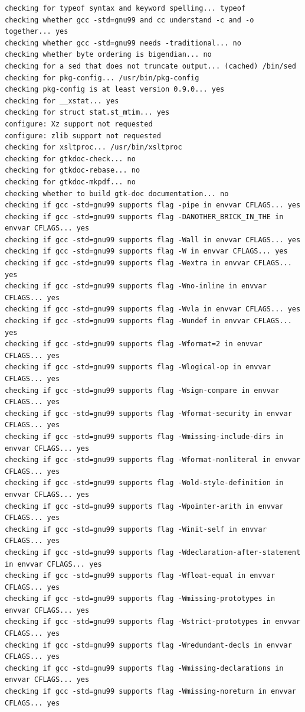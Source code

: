 {\begin{shaded}
\begin{verbatim}
checking for typeof syntax and keyword spelling... typeof
checking whether gcc -std=gnu99 and cc understand -c and -o together... yes
checking whether gcc -std=gnu99 needs -traditional... no
checking whether byte ordering is bigendian... no
checking for a sed that does not truncate output... (cached) /bin/sed
checking for pkg-config... /usr/bin/pkg-config
checking pkg-config is at least version 0.9.0... yes
checking for __xstat... yes
checking for struct stat.st_mtim... yes
configure: Xz support not requested
configure: zlib support not requested
checking for xsltproc... /usr/bin/xsltproc
checking for gtkdoc-check... no
checking for gtkdoc-rebase... no
checking for gtkdoc-mkpdf... no
checking whether to build gtk-doc documentation... no
checking if gcc -std=gnu99 supports flag -pipe in envvar CFLAGS... yes
checking if gcc -std=gnu99 supports flag -DANOTHER_BRICK_IN_THE in envvar CFLAGS... yes
checking if gcc -std=gnu99 supports flag -Wall in envvar CFLAGS... yes
checking if gcc -std=gnu99 supports flag -W in envvar CFLAGS... yes
checking if gcc -std=gnu99 supports flag -Wextra in envvar CFLAGS... yes
checking if gcc -std=gnu99 supports flag -Wno-inline in envvar CFLAGS... yes
checking if gcc -std=gnu99 supports flag -Wvla in envvar CFLAGS... yes
checking if gcc -std=gnu99 supports flag -Wundef in envvar CFLAGS... yes
checking if gcc -std=gnu99 supports flag -Wformat=2 in envvar CFLAGS... yes
checking if gcc -std=gnu99 supports flag -Wlogical-op in envvar CFLAGS... yes
checking if gcc -std=gnu99 supports flag -Wsign-compare in envvar CFLAGS... yes
checking if gcc -std=gnu99 supports flag -Wformat-security in envvar CFLAGS... yes
checking if gcc -std=gnu99 supports flag -Wmissing-include-dirs in envvar CFLAGS... yes
checking if gcc -std=gnu99 supports flag -Wformat-nonliteral in envvar CFLAGS... yes
checking if gcc -std=gnu99 supports flag -Wold-style-definition in envvar CFLAGS... yes
checking if gcc -std=gnu99 supports flag -Wpointer-arith in envvar CFLAGS... yes
checking if gcc -std=gnu99 supports flag -Winit-self in envvar CFLAGS... yes
checking if gcc -std=gnu99 supports flag -Wdeclaration-after-statement in envvar CFLAGS... yes
checking if gcc -std=gnu99 supports flag -Wfloat-equal in envvar CFLAGS... yes
checking if gcc -std=gnu99 supports flag -Wmissing-prototypes in envvar CFLAGS... yes
checking if gcc -std=gnu99 supports flag -Wstrict-prototypes in envvar CFLAGS... yes
checking if gcc -std=gnu99 supports flag -Wredundant-decls in envvar CFLAGS... yes
checking if gcc -std=gnu99 supports flag -Wmissing-declarations in envvar CFLAGS... yes
checking if gcc -std=gnu99 supports flag -Wmissing-noreturn in envvar CFLAGS... yes

\end{verbatim}
\end{shaded}}

